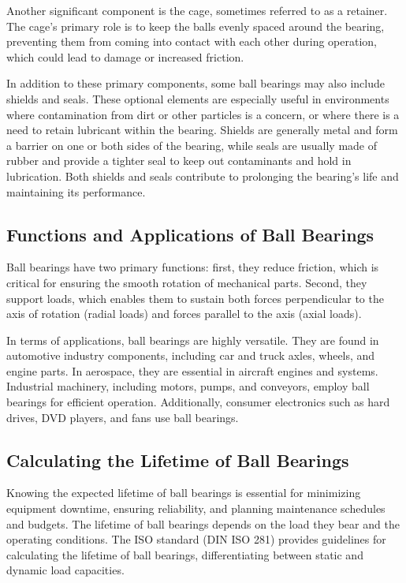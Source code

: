 Another significant component is the cage, sometimes referred to as a retainer. The cage's primary role is to keep the balls evenly spaced around the bearing, preventing them from coming into contact with each other during operation, which could lead to damage or increased friction.

In addition to these primary components, some ball bearings may also include shields and seals. These optional elements are especially useful in environments where contamination from dirt or other particles is a concern, or where there is a need to retain lubricant within the bearing. Shields are generally metal and form a barrier on one or both sides of the bearing, while seals are usually made of rubber and provide a tighter seal to keep out contaminants and hold in lubrication. Both shields and seals contribute to prolonging the bearing's life and maintaining its performance.

\subsection{Functions and Applications of Ball Bearings}

Ball bearings have two primary functions: first, they reduce friction, which is critical for ensuring the smooth rotation of mechanical parts. Second, they support loads, which enables them to sustain both forces perpendicular to the axis of rotation (radial loads) and forces parallel to the axis (axial loads).

In terms of applications, ball bearings are highly versatile. They are found in automotive industry components, including car and truck axles, wheels, and engine parts. In aerospace, they are essential in aircraft engines and systems. Industrial machinery, including motors, pumps, and conveyors, employ ball bearings for efficient operation. Additionally, consumer electronics such as hard drives, DVD players, and fans use ball bearings.


\subsection{Calculating the Lifetime of Ball Bearings}
\label{sec:lifetime_calculation}

Knowing the expected lifetime of ball bearings is essential for minimizing equipment downtime, ensuring reliability, and planning maintenance schedules and budgets. The lifetime of ball bearings depends on the load they bear and the operating conditions. The ISO standard (DIN ISO 281) provides guidelines for calculating the lifetime of ball bearings, differentiating between static and dynamic load capacities.

